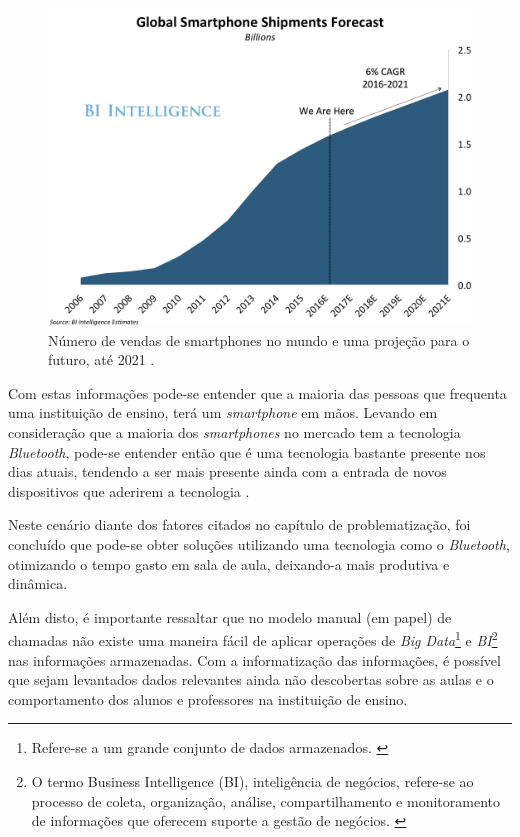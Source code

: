 \documentclass[
	12pt,
	oneside,
	a4paper,
	english,
	brazil,
]{abntex2}
\begin{document}
\begin{figure}[h]
\centering
\includegraphics[width=1.0\textwidth]{smartphone_sales}
    \caption{
        Número de vendas de smartphones no mundo e uma projeção para o futuro, até 2021 \cite{smartphone-numbers-image}.
    }
\end{figure}

Com estas informações pode-se entender que a maioria das pessoas que frequenta uma instituição de ensino, terá um \emph{smartphone} em mãos. Levando em consideração que a maioria dos \emph{smartphones} no mercado tem a tecnologia \emph{Bluetooth}, pode-se entender então que é uma tecnologia bastante presente nos dias atuais, tendendo a ser mais presente ainda com a entrada de novos dispositivos que aderirem a tecnologia \cite{bluetooth-devices}.

Neste cenário diante dos fatores citados no capítulo de problematização, foi concluído que pode-se obter soluções utilizando uma tecnologia como o \emph{Bluetooth}, otimizando o tempo gasto em sala de aula, deixando-a mais produtiva e dinâmica.

Além disto, é importante ressaltar que no modelo manual (em papel) de chamadas não existe uma maneira fácil de aplicar operações de \emph{Big Data}\footnote{Refere-se a um grande conjunto de dados armazenados. \cite{bigdata-wikipedia}} e \emph{BI}\footnote{O termo Business Intelligence (BI), inteligência de negócios, refere-se ao processo de coleta, organização, análise, compartilhamento e monitoramento de informações que oferecem suporte a gestão de negócios. \cite{bi-mean}} nas informações armazenadas. Com a informatização das informações, é possível que sejam levantados dados relevantes ainda não descobertas sobre as aulas e o comportamento dos alunos e professores na instituição de ensino.
\end{document}
